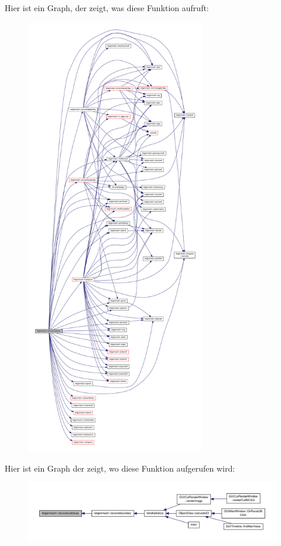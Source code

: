 Hier ist ein Graph, der zeigt, was diese Funktion aufruft\-:\nopagebreak
\begin{figure}[H]
\begin{center}
\leavevmode
\includegraphics[height=550pt]{classtetgenmesh_ace09080e4f274e0a48cd1728475878c9_cgraph}
\end{center}
\end{figure}




Hier ist ein Graph der zeigt, wo diese Funktion aufgerufen wird\-:\nopagebreak
\begin{figure}[H]
\begin{center}
\leavevmode
\includegraphics[width=350pt]{classtetgenmesh_ace09080e4f274e0a48cd1728475878c9_icgraph}
\end{center}
\end{figure}


